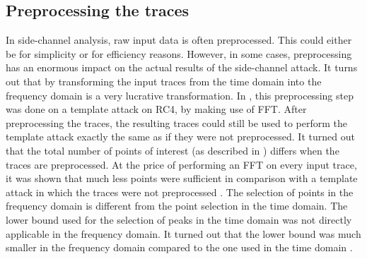 \subsection{Preprocessing the traces} \label{subsec: template attacks preprocessing the traces}
In side-channel analysis, raw input data is often preprocessed. 
This could either be for simplicity or for efficiency reasons.
However, in some cases, preprocessing has an enormous impact on the actual results of the side-channel attack.
It turns out that by transforming the input traces from the time domain into the frequency domain is a very lucrative transformation. In \cite{rechberger2004practical}, this preprocessing step was done on a template attack on RC4, by making use of FFT.
After preprocessing the traces, the resulting traces could still be used to perform the template attack exactly the same as if they were not preprocessed.
It turned out that the total number of points of interest (as described in ) differs when the traces are preprocessed. 
At the price of performing an FFT on every input trace, it was shown that much less points were sufficient in comparison with a template attack in which the traces were not preprocessed \cite{rechberger2004practical}.
The selection of points in the frequency domain is different from the point selection in the time domain.
The lower bound used for the selection of peaks in the time domain was not directly applicable in the frequency domain.
It turned out that the lower bound was much smaller in the frequency domain compared to the one used in the time domain \cite{rechberger2004practical}.

